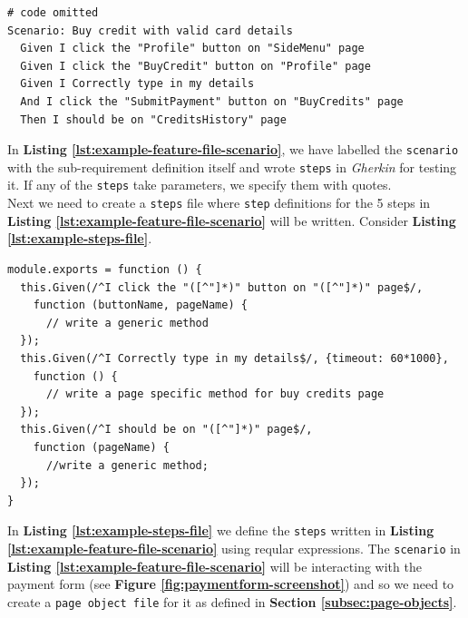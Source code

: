 \begin{listing}[H]
\begin{verbatim}
# code omitted
Scenario: Buy credit with valid card details
  Given I click the "Profile" button on "SideMenu" page
  Given I click the "BuyCredit" button on "Profile" page
  Given I Correctly type in my details
  And I click the "SubmitPayment" button on "BuyCredits" page
  Then I should be on "CreditsHistory" page
\end{verbatim}
\label{lst:example-feature-file-scenario}
\end{listing}

In \textbf{Listing \ref{lst:example-feature-file-scenario}}, we have labelled the \texttt{scenario} with the sub-requirement definition itself and wrote \texttt{steps} in \textit{Gherkin} for testing it. If any of the \texttt{steps} take parameters, we specify them with quotes.\\

Next we need to create a \texttt{steps} file where \texttt{step} definitions for the 5 steps in \textbf{Listing \ref{lst:example-feature-file-scenario}} will be written. Consider \textbf{Listing \ref{lst:example-steps-file}}.

\begin{listing}[H]
\begin{verbatim}
module.exports = function () {
  this.Given(/^I click the "([^"]*)" button on "([^"]*)" page$/,
    function (buttonName, pageName) {
      // write a generic method
  });
  this.Given(/^I Correctly type in my details$/, {timeout: 60*1000},
    function () {
      // write a page specific method for buy credits page
  });
  this.Given(/^I should be on "([^"]*)" page$/,
    function (pageName) {
      //write a generic method;
  });
}
\end{verbatim}
\label{lst:example-steps-file}
\end{listing}

In \textbf{Listing \ref{lst:example-steps-file}} we define the \texttt{steps} written in \textbf{Listing \ref{lst:example-feature-file-scenario}} using reqular expressions. The \texttt{scenario} in \textbf{Listing \ref{lst:example-feature-file-scenario}} will be interacting with the payment form (see \textbf{Figure \ref{fig:paymentform-screenshot}}) and so we need to create a \texttt{page object file} for it as defined in  \textbf{Section \ref{subsec:page-objects}}.

